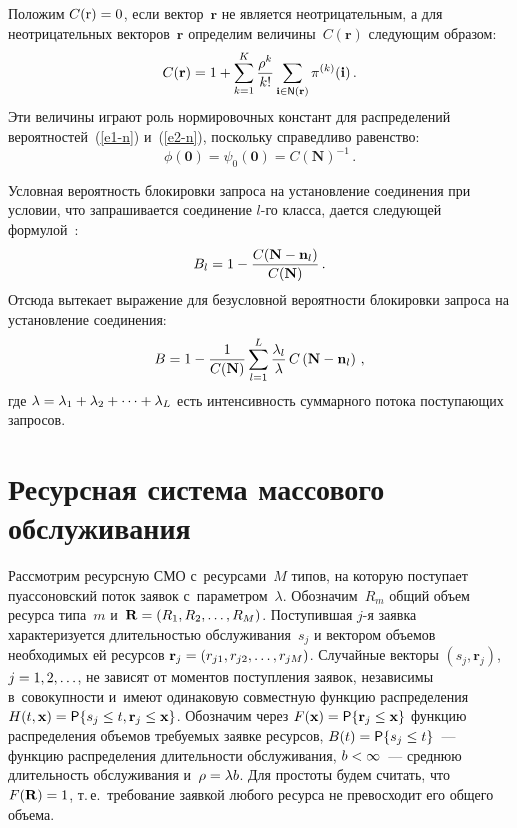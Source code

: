 \begin{multicols}{2}
  Положим $C(\mathrm{r})\hm=0$, если вектор~$\mathbf{r}$ не является 
не\-от\-ри\-ца\-тельным, а для неотрицательных векторов~$\mathbf{r}$ определим 
величины~$C(\mathbf{r})$ следующим образом:
  \begin{equation}
  C(\mathbf{r}) = 1+\sum\limits_{k=1}^K \displaystyle\frac{\displaystyle \rho^k\mathstrut}{\displaystyle k!\mathstrut} 
\sum\limits_{\mathbf{i}\in {\sf N}(\mathbf{r})} \pi^{(k)} (\mathbf{i})\,.
  \label{e5-n}
\end{equation}
Эти величины играют роль нормировочных констант для распределений 
вероятностей~(\ref{e1-n}) и~(\ref{e2-n}), поскольку справедливо равенство:
\begin{equation}
\phi(\mathbf{0}) =\psi_0(\mathbf{0}) =C(\mathbf{N})^{-1}\,.
\label{e6-n}
\end{equation}
  
  Условная вероятность блокировки запроса на установление соединения при 
условии, что запрашивается соединение $l$-го класса, дается следующей 
формулой~\cite{7-n}:
  \begin{equation*}
  B_l = 1- \displaystyle\frac{\displaystyle C(\mathbf{N}-\mathbf{n}_l)\mathstrut}{\displaystyle C(\mathbf{N})\mathstrut}\,.
  \end{equation*}
Отсюда вытекает выражение для безусловной вероятности блокировки запроса 
на установление соединения: 
\begin{equation}
B= 1-\displaystyle\frac{\displaystyle 1\mathstrut}{\displaystyle C(\mathbf{N})\mathstrut}\sum\limits_{l=1}^L \displaystyle\frac{\displaystyle \lambda_l\mathstrut}{\displaystyle \lambda\mathstrut}\,C\left( 
\mathbf{N} - \mathbf{n}_l\right)\,,
\label{e8-n}
\end{equation}
где $\lambda= \lambda_1\hm+ \lambda_2+\cdots+ \lambda_L$ есть интенсивность 
суммарного потока поступающих запросов.

\section{Ресурсная система массового обслуживания}

Рассмотрим ресурсную СМО с~ресурсами~$M$ типов, на которую поступает 
пуассоновский поток заявок с~параметром~$\lambda$. Обозначим~$R_m$ 
общий объем ресурса типа~$m$ и~$\mathbf{R}\hm= (R_1, R_2,\ldots , R_M)$. 
Поступившая $j$-я заявка характеризуется длительностью обслуживания~$s_j$ 
и вектором объемов необходимых ей ресурсов $\mathbf{r}_j\hm= (r_{j1}, r_{j2}, 
\ldots , r_{jM})$. Случайные векторы $(s_j,\mathbf{r}_j)$, $j\hm=1,2,\ldots$, не 
зависят от моментов поступления заявок, независимы в~совокупности и~имеют 
одинаковую совместную функцию распределения $H(t,\mathbf{x}) \hm= {\sf P}\{ 
s_j\leq t, \mathbf{r}_j\leq \mathbf{x}\}$. \mbox{Обозначим} через $F(\mathbf{x}) \hm= 
{\sf P}\{\mathbf{r}_j\leq \mathbf{x}\}$ функцию распределения объемов требуемых 
заявке ресурсов, $B(t)\hm= {\sf P}\{s_j\leq t\}$~--- функцию распределения 
дли\-тель\-ности обслуживания, $b\hm<\infty$~--- среднюю \mbox{длительность} 
обслуживания и~$\rho\hm= \lambda b$. Для простоты будем считать, что 
$F(\mathbf{R})\hm=1$, т.\,е.\ требование заявкой любого ресурса не превосходит 
его общего объема. 
  

\end{multicols}
